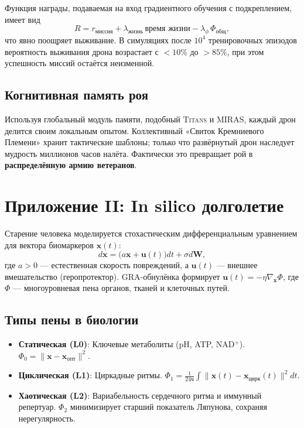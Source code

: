 \documentclass[12pt,a4paper]{article}
\begin{document}
Функция награды, подаваемая на вход градиентного обучения с подкреплением, имеет вид
\begin{equation}
R = r_{\text{миссия}} + \lambda_{\text{жизнь}} \, \text{время жизни} - \lambda_{\phi} \, \Phi_{\text{общ}},
\end{equation}
что явно поощряет выживание.
В симуляциях после $10^4$ тренировочных эпизодов вероятность выживания дрона возрастает с $<10\%$ до $>85\%$, при этом успешность миссий остаётся неизменной.

\subsection{Когнитивная память роя}
Используя глобальный модуль памяти, подобный \textsc{Titans} и \textsc{MIRAS}, каждый дрон делится своим локальным опытом.
Коллективный «Свиток Кремниевого Племени» хранит тактические шаблоны; только что развёрнутый дрон наследует мудрость миллионов часов налёта.
Фактически это превращает рой в \textbf{распределённую армию ветеранов}.

\section{Приложение II: In silico долголетие}
\label{sec:longevity}

Старение человека моделируется стохастическим дифференциальным уравнением для вектора биомаркеров $\mathbf{x}(t)$:
\begin{equation}
d\mathbf{x} = \big( a \mathbf{x} + \mathbf{u}(t) \big) dt + \sigma d\mathbf{W},
\end{equation}
где $a>0$ — естественная скорость повреждений, а $\mathbf{u}(t)$ — внешнее вмешательство (геропротектор).
GRA-обнулёнка формирует $\mathbf{u}(t) = -\eta \nabla_{\mathbf{x}} \Phi$,
где $\Phi$ — многоуровневая пена органов, тканей и клеточных путей.

\subsection{Типы пены в биологии}
\begin{itemize}
\item \textbf{Статическая (L0)}: Ключевые метаболиты (pH, ATP, NAD$^+$). $\Phi_0 = \|\mathbf{x} - \mathbf{x}_{\text{опт}}\|^2$.
\item \textbf{Циклическая (L1)}: Циркадные ритмы. $\Phi_1 = \frac{1}{24\text{ч}}\int \| \mathbf{x}(t) - \mathbf{x}_{\text{цирк}}(t) \|^2 dt$.
\item \textbf{Хаотическая (L2)}: Вариабельность сердечного ритма и иммунный репертуар. $\Phi_2$ минимизирует старший показатель Ляпунова, сохраняя нерегулярность.
\end{itemize}
\end{document}
